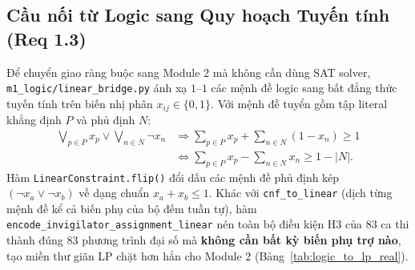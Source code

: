 \subsection{Cầu nối từ Logic sang Quy hoạch Tuyến tính (Req 1.3)}
\label{sec:m1_bridge}

Để chuyển giao ràng buộc sang Module 2 mà không cần dùng SAT solver, \texttt{m1\_\allowbreak logic/\allowbreak linear\_\allowbreak bridge.py} ánh xạ $1$--$1$ các mệnh đề logic sang bất đẳng thức tuyến tính trên biến nhị phân $x_{ij} \in \{0, 1\}$. Với mệnh đề tuyển gồm tập literal khẳng định $P$ và phủ định $N$:
\begin{equation}
\begin{aligned}
    \bigvee_{p \in P} x_p \lor \bigvee_{n \in N} \neg x_n
    &\Longrightarrow \sum_{p \in P} x_p + \sum_{n \in N} (1 - x_n) \ge 1 \\
    &\iff \sum_{p \in P} x_p - \sum_{n \in N} x_n \ge 1 - |N|.
\end{aligned}
\end{equation}
Hàm \texttt{LinearConstraint.flip()} đổi dấu các mệnh đề phủ định kép $(\neg x_a \lor \neg x_b)$ về dạng chuẩn $x_a + x_b \le 1$. Khác với \texttt{cnf\_to\_linear} (dịch từng mệnh đề kể cả biến phụ của bộ đếm tuần tự), hàm \texttt{encode\_\allowbreak invigilator\_\allowbreak assignment\_\allowbreak linear} nén toàn bộ điều kiện H3 của $83$ ca thi thành đúng $83$ phương trình đại số mà \textbf{không cần bất kỳ biến phụ trợ nào}, tạo miền thư giãn LP chặt hơn hẳn cho Module 2 (Bảng~\ref{tab:logic_to_lp_real}).

